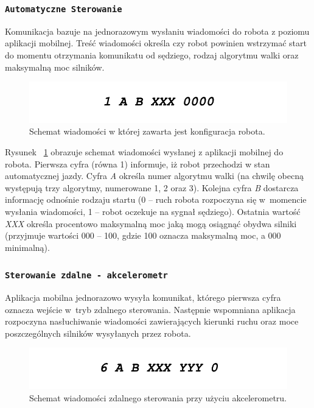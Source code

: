  \subsubsection{\lstinline$Automatyczne Sterowanie$}

Komunikacja bazuje na jednorazowym wysłaniu wiadomości do robota z poziomu aplikacji mobilnej. Treść wiadomości określa czy robot powinien wstrzymać start do momentu otrzymania komunikatu od sędziego, rodzaj algorytmu walki oraz maksymalną moc silników.

\begin{figure}[H]
	\centering
		\includegraphics[width=0.75\linewidth]{pic03/automatic.pdf}
	\caption{Schemat wiadomości w której zawarta jest konfiguracja robota.}
	\label{fig:automatic}	
\end{figure}

Rysunek ~\ref{fig:automatic} obrazuje schemat wiadomości wysłanej z aplikacji mobilnej do robota. Pierwsza cyfra (równa 1) informuje, iż robot przechodzi w stan automatycznej jazdy. Cyfra \textit{A} określa numer algorytmu walki (na chwilę obecną występują trzy algorytmy, numerowane 1, 2 oraz 3). Kolejna cyfra \textit{B} dostarcza informację odnośnie rodzaju startu (0 – ruch robota rozpoczyna się w~momencie wysłania wiadomości, 1 – robot oczekuje na sygnał sędziego). Ostatnia wartość \textit{XXX} określa procentowo maksymalną moc jaką mogą osiągnąć obydwa silniki (przyjmuje wartości 000 – 100, gdzie 100 oznacza maksymalną moc, a 000 minimalną).

 \subsubsection{\lstinline$Sterowanie zdalne - akcelerometr$}

Aplikacja mobilna jednorazowo wysyła komunikat, którego pierwsza cyfra oznacza wejście w~tryb zdalnego sterowania. Następnie wspomniana aplikacja rozpoczyna nasłuchiwanie wiadomości zawierających kierunki ruchu oraz moce poszczególnych silników wysyłanych przez robota.

\begin{figure}[H]
	\centering
		\includegraphics[width=0.75\linewidth]{pic03/accelerometer.pdf}
	\caption{Schemat wiadomości zdalnego sterowania przy użyciu akcelerometru.}
	\label{fig:accelerometer}	
\end{figure}

